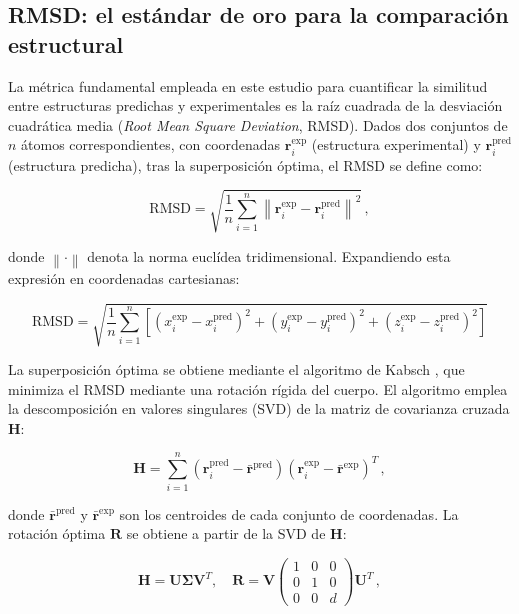 \subsection{RMSD: el est\'andar de oro para la comparaci\'on estructural}
\label{subsec:rmsd}

La m\'etrica fundamental empleada en este estudio para cuantificar la similitud entre estructuras predichas y experimentales es la ra\'iz cuadrada de la desviaci\'on cuadr\'atica media (\textit{Root Mean Square Deviation}, RMSD). Dados dos conjuntos de $n$ \'atomos correspondientes, con coordenadas $\mathbf{r}_i^{\text{exp}}$ (estructura experimental) y $\mathbf{r}_i^{\text{pred}}$ (estructura predicha), tras la superposici\'on \'optima, el RMSD se define como:

\begin{equation}
    \text{RMSD} = \sqrt{\frac{1}{n} \sum_{i=1}^{n} \left\| \mathbf{r}_i^{\text{exp}} - \mathbf{r}_i^{\text{pred}} \right\|^2}\,,
    \label{eq:rmsd}
\end{equation}

\noindent donde $\left\| \cdot \right\|$ denota la norma eucl\'idea tridimensional. Expandiendo esta expresi\'on en coordenadas cartesianas:

\begin{equation}
    \text{RMSD} = \sqrt{\frac{1}{n} \sum_{i=1}^{n} \left[ (x_i^{\text{exp}} - x_i^{\text{pred}})^2 + (y_i^{\text{exp}} - y_i^{\text{pred}})^2 + (z_i^{\text{exp}} - z_i^{\text{pred}})^2 \right]}
    \label{eq:rmsd_cartesiano}
\end{equation}

La superposici\'on \'optima se obtiene mediante el algoritmo de Kabsch \citep{kabsch1976solution}, que minimiza el RMSD mediante una rotaci\'on r\'igida del cuerpo. El algoritmo emplea la descomposici\'on en valores singulares (SVD) de la matriz de covarianza cruzada $\mathbf{H}$:

\begin{equation}
    \mathbf{H} = \sum_{i=1}^{n} (\mathbf{r}_i^{\text{pred}} - \bar{\mathbf{r}}^{\text{pred}})(\mathbf{r}_i^{\text{exp}} - \bar{\mathbf{r}}^{\text{exp}})^T\,,
    \label{eq:covarianza_cruzada}
\end{equation}

\noindent donde $\bar{\mathbf{r}}^{\text{pred}}$ y $\bar{\mathbf{r}}^{\text{exp}}$ son los centroides de cada conjunto de coordenadas. La rotaci\'on \'optima $\mathbf{R}$ se obtiene a partir de la SVD de $\mathbf{H}$:

\begin{equation}
    \mathbf{H} = \mathbf{U} \boldsymbol{\Sigma} \mathbf{V}^T, \quad \mathbf{R} = \mathbf{V} \begin{pmatrix} 1 & 0 & 0 \\ 0 & 1 & 0 \\ 0 & 0 & d \end{pmatrix} \mathbf{U}^T\,,
    \label{eq:rotacion_optima}
\end{equation}


